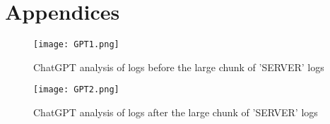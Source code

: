 \documentclass[
	letterpaper, %
	10pt, %
	unnumberedsections, %
	twoside, %
]{APAAssignment}
\begin{document}

\appendix


\clearpage
\chapter{Appendices}
\begin{appendices}
\begin{figure}[!htp] %
	\centering
	\texttt{[image: GPT1.png]}
	\caption{ChatGPT analysis of logs before the large chunk of 'SERVER' logs}	\label{fig:GPT1.png}
\end{figure}
\begin{figure}[!htp] %
	\centering
	\texttt{[image: GPT2.png]}
	\caption{ChatGPT analysis of logs after the large chunk of 'SERVER' logs}	\label{fig:GPT2.png}
\end{figure}



\end{appendices}
\end{document}
